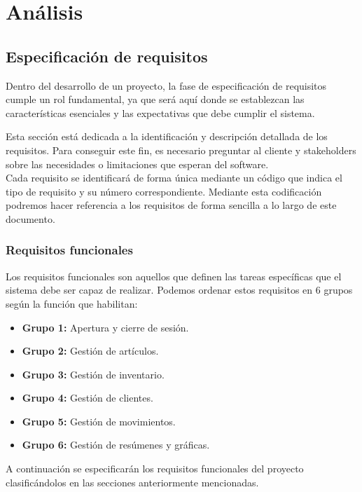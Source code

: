 \chapter{Análisis}
\label{chap:analysis}

\section{Especificación de requisitos}

Dentro del desarrollo de un proyecto, la fase de especificación de requisitos cumple un rol fundamental, ya que será aquí donde se establezcan las características esenciales y las expectativas que debe cumplir el sistema. 

Esta sección está dedicada a la identificación y descripción detallada de los requisitos. Para conseguir este fin, es necesario preguntar al cliente y stakeholders sobre las necesidades o limitaciones que esperan del software.\\
 
Cada requisito se identificará de forma única mediante un código que indica el tipo de requisito y su número correspondiente. Mediante esta codificación podremos hacer referencia a los requisitos de forma sencilla a lo largo de este documento. 


\subsection{Requisitos funcionales}

Los requisitos funcionales son aquellos que definen las tareas específicas que el sistema debe ser capaz de realizar. Podemos ordenar estos requisitos en 6 grupos según la función que habilitan: 

\begin{itemize}
	\item \textbf{Grupo 1:} Apertura y cierre de sesión. 
	\item \textbf{Grupo 2:} Gestión de artículos.
	\item \textbf{Grupo 3:} Gestión de inventario. 
	\item \textbf{Grupo 4:} Gestión de clientes. 
	\item \textbf{Grupo 5:} Gestión de movimientos.
	\item \textbf{Grupo 6:} Gestión de resúmenes y gráficas. 
\end{itemize}

A continuación se especificarán los requisitos funcionales del proyecto clasificándolos en las secciones anteriormente mencionadas. 


